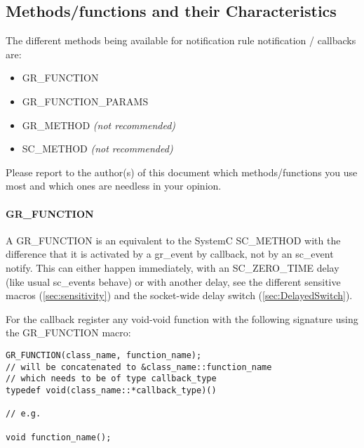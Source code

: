 \subsection{Methods/functions and their Characteristics}

The different methods being available for notification rule notification / callbacks are:
\begin{itemize}
  \item {\sffamily GR\_FUNCTION}  \vspace{-.5em}
  \item {\sffamily GR\_FUNCTION\_PARAMS}  \vspace{-.5em}
  \item {\sffamily GR\_METHOD} {\em (not recommended)}
  \item {\sffamily SC\_METHOD} {\em (not recommended)}
\end{itemize}

Please report to the author(s) of this document which methods/functions you use most and which ones are needless in your opinion.


\paragraph{GR\_FUNCTION} 
A {\sffamily GR\_FUNCTION} is an equivalent to the SystemC {\sffamily SC\_METHOD} with the difference that it is activated by a {\sffamily gr\_event} by callback, not by an {\sffamily sc\_event} notify. This can either happen immediately, with an {\sffamily SC\_ZERO\_TIME} delay (like usual {\sffamily sc\_event}s behave) or with another delay, see the different sensitive macros (\ref{sec:sensitivity}) and the socket-wide delay switch (\ref{sec:DelayedSwitch}).



For the callback register any void-void function with the following signature using the {\sffamily GR\_FUNCTION} macro:\vspace{-.5em}
\begin{lstlisting}
GR_FUNCTION(class_name, function_name); 
// will be concatenated to &class_name::function_name
// which needs to be of type callback_type
typedef void(class_name::*callback_type)()

// e.g.

void function_name();
\end{lstlisting}


